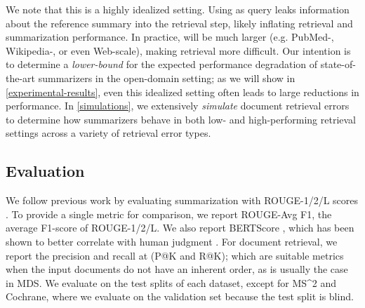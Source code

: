 \documentclass[11pt]{article}
\newcommand\mstoo{{MS\^{}2}\xspace}
\begin{document}
\noindent We note that this is a highly idealized setting. Using  as query leaks information about the reference summary into the retrieval step, likely inflating retrieval and summarization performance. In practice,  will be much larger (e.g. PubMed-, Wikipedia-, or even Web-scale), making retrieval more difficult. Our intention is to determine a \textit{lower-bound} for the expected performance degradation of state-of-the-art summarizers in the open-domain setting; as we will show in \textsection \ref{experimental-results}, even this idealized setting often leads to large reductions in performance. In \textsection \ref{simulations}, we extensively \textit{simulate} document retrieval errors to determine how summarizers behave in both low- and high-performing retrieval settings across a variety of retrieval error types.

\subsection{Evaluation} \label{experimental-setup:evaluation}


We follow previous work by evaluating summarization with ROUGE-1/2/L scores \citep{lin-2004-rouge}. To provide a single metric for comparison, we report ROUGE-Avg F1, the average F1-score of ROUGE-1/2/L. We also report BERTScore \citep{bertscore}, which has been shown to better correlate with human judgment \citep{bartscore, Fischer2022MeasuringFO}. For document retrieval, we report the precision and recall at  (P@K and R@K); which are suitable metrics when the input documents do not have an inherent order, as is usually the case in MDS. We evaluate on the test splits of each dataset, except for \mstoo and Cochrane, where we evaluate on the validation set because the test split is blind.
\end{document}
